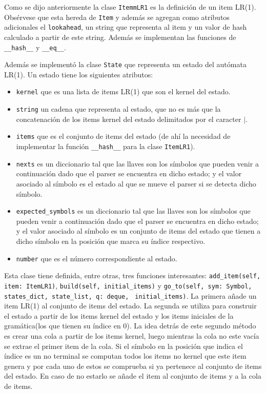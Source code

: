 Como se dijo anteriormente la clase \verb|ItemmLR1| es la definici\'on de un item LR(1). Obs\'ervese que esta hereda de \verb|Item| y adem\'as se agregan como atributos adicionales el \verb|lookahead|, un string que representa al item y un valor de hash calculado a partir de este string. Adem\'as se implementan las funciones de \verb|__hash__| y \verb|__eq__|. 

Adem\'as se implement\'o la clase \verb|State| que representa un estado del aut\'omata LR(1). Un estado tiene los siguientes atributos:

\begin{itemize}
	\item \verb|kernel| que es una lista de items LR(1) que son el kernel del estado.
	\item \verb|string| un cadena que representa al estado, que no es m\'as que la concatenaci\'on de los items kernel del estado delimitados por el caracter $|$.
	\item \verb|items| que es el conjunto de items del estado (de ah\'i la necesidad de implementar la funci\'on \verb|__hash__| para la clase \verb|ItemLR1|).
	\item \verb|nexts| es un diccionario tal que las llaves son los s\'imbolos que pueden venir a continuaci\'on dado que el parser se encuentra en dicho estado; y el valor asociado al s\'imbolo es el estado al que se mueve el parser si se detecta dicho s\'imbolo.
	\item \verb|expected_symbols| es un diccionario tal que las llaves son los s\'imbolos que pueden venir a continuaci\'on dado que el parser se encuentra en dicho estado; y el valor asociado al s\'imbolo es un conjunto de items del estado que tienen a dicho s\'imbolo en la posici\'on que marca su \'indice respectivo.
	\item \verb|number| que es el n\'umero correspondiente al estado.
\end{itemize} 

Esta clase tiene definida, entre otras, tres funciones interesantes: \verb|add_item(self, item: ItemLR1)|, \verb|build(self, initial_items)| y \verb|go_to(self, sym: Symbol, states_dict, state_list, q: deque,| \verb| initial_items)|. La primera a\~{n}ade un item LR(1) al conjunto de items del estado. La segunda se utiliza para construir el estado a partir de los items kernel del estado y los items iniciales de la gram\'atica(los que tienen su \'indice en 0). La idea detr\'as de este segundo m\'etodo es crear una cola a partir de los items kernel, luego mientras la cola no este vac\'ia se extrae el primer item de la cola. Si el s\'imbolo en la posici\'on que indica el \'indice es un no terminal se computan todos los items no kernel que este item genera y por cada uno de estos se comprueba si ya pertenece al conjunto de items del estado. En caso de no estarlo se a\~{n}ade el item al conjunto de items y a la cola de items. 

